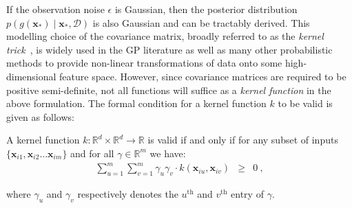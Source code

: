If the observation noise $\epsilon$ is Gaussian, then the posterior distribution $p(g(\mathbf{x}_\ast) \mid \mathbf{x}_\ast, \mathcal{D})$ is also Gaussian and can be tractably derived. This modelling choice of the covariance matrix, broadly referred to as the \emph{kernel trick}~\cite{hofmann2006support}, is widely used in the GP literature as well as many other probabilistic methods to provide non-linear transformations of data onto some high-dimensional feature space. However, since covariance matrices are required to be positive semi-definite, not all functions will suffice as a \emph{kernel function} in the above formulation. The formal condition for a kernel function $k$ to be valid is given as follows:

\begin{definition} 
\label{c3-def:validkernel}
A kernel function $k: \mathbb{R}^d \times \mathbb{R}^d \rightarrow \mathbb{R}$
is valid if and only if for any subset of inputs $\{\mathbf{x}_{i1}, \mathbf{x}_{i2} \dots \mathbf{x}_{im}\}$ and for all $\gamma \in \mathbb{R}^m$ we have:
\begin{eqnarray}
 \sum_{u=1}^m\sum_{v=1}^m \gamma_u \gamma_v \cdot k(\mathbf{x}_{iu}, \mathbf{x}_{iv})  &\geq& 0 \ ,
\end{eqnarray}
\end{definition}
where $\gamma_u$ and $\gamma_v$ respectively denotes the $u^{\text{th}}$ and $v^{\text{th}}$ entry of $\gamma$. 

